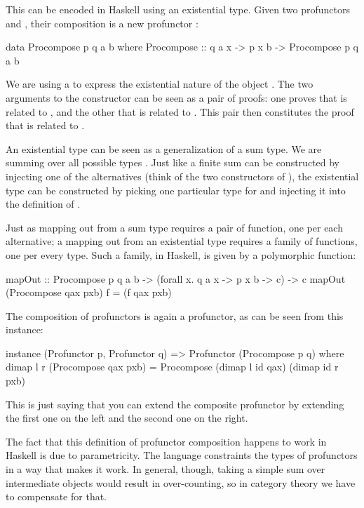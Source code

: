 \documentclass[DaoFP]{subfiles}
\begin{document}
This can be encoded in Haskell using an existential type. Given two profunctors  and , their composition is a new profunctor :
\begin{haskell}
data Procompose p q a b where
  Procompose ::  q a x -> p x b -> Procompose p q a b
\end{haskell}
We are using a  to express the existential nature of the object . The two arguments to the constructor can be seen as a pair of proofs: one proves that  is related to , and the other that  is related to . This pair then constitutes the proof that  is related to .

An existential type can be seen as a generalization of a sum type. We are summing over all possible types . Just like a finite sum can be constructed by injecting one of the alternatives (think of the two constructors of ), the existential type can be constructed by picking one particular type for  and injecting it into the definition of . 

Just as mapping out from a sum type requires a pair of function, one per each alternative; a mapping out from an existential type requires a family of functions, one per every type. Such a family, in Haskell, is given by a polymorphic function:
\begin{haskell}
mapOut :: Procompose p q a b -> (forall x. q a x -> p x b -> c) -> c
mapOut (Procompose qax pxb) f = (f qax pxb)
\end{haskell}

The composition of profunctors is again a profunctor, as can be seen from this instance:
\begin{haskell}
instance (Profunctor p, Profunctor q) => Profunctor (Procompose p q) 
  where
    dimap l r (Procompose qax pxb) = 
               Procompose (dimap l id qax) (dimap id r pxb)
\end{haskell}
This is just saying that you can extend the composite profunctor by extending the first one on the left and the second one on the right.

The fact that this definition of profunctor composition happens to work in Haskell is due to parametricity. The language constraints the types of profunctors in a way that makes it work. In general, though, taking a simple sum over intermediate objects would result in over-counting, so in category theory we have to compensate for that.
\end{document}
